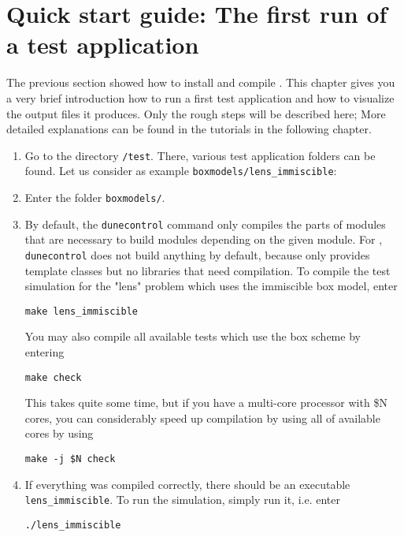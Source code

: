 \section[Quick start guide]{Quick start guide: The first run of a test application}
\label{quick-start-guide}

The previous section showed how to install and compile \eWoms. This
chapter gives you a very brief introduction how to run a first test
application and how to visualize the output files it produces. Only the
rough steps will be described here; More detailed explanations can be
found in the tutorials in the following chapter.

\begin{enumerate}
\item Go to the directory \texttt{/test}. There, various test
  application folders can be found. Let us consider as example
  \texttt{boxmodels/lens{\_}immiscible}:
\item Enter the folder \texttt{boxmodels/}. 
\item By default, the \texttt{dunecontrol} command only compiles the
  parts of \Dune modules that are necessary to build modules depending
  on the given module. For \eWoms, \texttt{dunecontrol} does not build
  anything by default, because \eWoms only provides \Cplusplus
  template classes but no libraries that need compilation. To compile
  the test simulation for the "lens" problem which uses the immiscible
  box model, enter
\begin{lstlisting}[style=Bash]
make lens_immiscible
\end{lstlisting}

You may also compile all available tests which use the box scheme by entering
\begin{lstlisting}[style=Bash]
make check
\end{lstlisting}

This takes quite some time, but if you have a multi-core processor
with \$N cores, you can considerably speed up compilation by using all
of available cores by using
\begin{lstlisting}[style=Bash]
make -j $N check
\end{lstlisting}

\item If everything was compiled correctly, there should be an
  executable \texttt{lens{\_}immiscible}. To run the simulation,
  simply run it, i.e. enter
\begin{lstlisting}[style=Bash]
./lens_immiscible
\end{lstlisting}


\end{enumerate}

